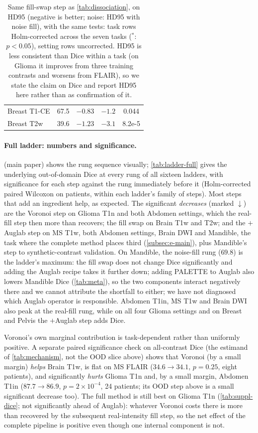 \begin{table}[t]
\begin{tabular}{lcccc}
\quad Breast T1-CE & 67.5 & $-0.83$ & $-1.2$ & 0.044 \\
\quad Breast T2w & 39.6 & $-1.23$ & $-3.1$ & 8.2e-5 \\
\bottomrule
\end{tabular}
\caption{Same fill-swap step as \cref{tab:dissociation}, on HD95 (negative is
better; noise: HD95 with noise fill), with the same tests: task rows Holm-corrected across the seven tasks
($^*$: $p<0.05$), setting rows uncorrected. HD95 is less consistent than Dice
within a task (on Glioma it improves from three training contrasts and
worsens from FLAIR), so we state the claim on Dice and report HD95 here rather
than as confirmation of it.}
\label{tab:dissociation-hd95}
\end{table}

\paragraph{Full ladder: numbers and significance.}  (main
paper) shows the rung sequence visually; \cref{tab:ladder-full} gives the
underlying out-of-domain Dice at every rung of all sixteen ladders, with
significance for each step against the rung immediately before it
(Holm-corrected paired Wilcoxon on patients, within each ladder's family of
steps). Most steps that add an ingredient help, as expected.
The significant
\emph{decreases} (marked $\downarrow$) are the Voronoi step on Glioma T1n and
both Abdomen settings, which the real-fill step then more than recovers; the fill swap
on Brain T1w and T2w; and the $+$Auglab step on MS T1w,
both Abdomen settings, Brain DWI and Mandible, the task where
the complete method places third (\cref{subsec:e-main}), plus Mandible's step
to synthetic-contrast validation. On Mandible, the noise-fill rung ($69.8$) is
the ladder's maximum: the fill swap does not change Dice significantly and
adding the Auglab recipe takes it further down; adding PALETTE to Auglab also lowers Mandible Dice (\cref{tab:meta}), so
the two components interact negatively there and we cannot attribute the
shortfall to either; we have not diagnosed which Auglab operator is responsible.
Abdomen T1in, MS T1w and Brain DWI also peak at the real-fill rung, while on all four Glioma settings and on Breast and Pelvis the $+$Auglab step adds Dice.

Voronoi's own marginal contribution is
task-dependent rather than uniformly positive. A separate paired
significance check on all-contrast Dice (the estimand of \cref{tab:mechanism},
not the OOD slice above) shows that Voronoi
(by a small margin) \emph{helps} Brain T1w, is flat on MS FLAIR
($34.6\to34.1$, $p=0.25$, eight patients), and significantly \emph{hurts} Glioma T1n and, by a small margin, Abdomen
T1in ($87.7\to86.9$, $p=2\times10^{-4}$, 24 patients; its OOD step above is a
small significant decrease too). The full method is still best on Glioma T1n
(\cref{tab:suppl-dice}; not significantly ahead of Auglab): whatever Voronoi costs there is more than recovered by
the subsequent real-intensity fill step, so the net effect of the complete
pipeline is positive even though one internal component is not.

